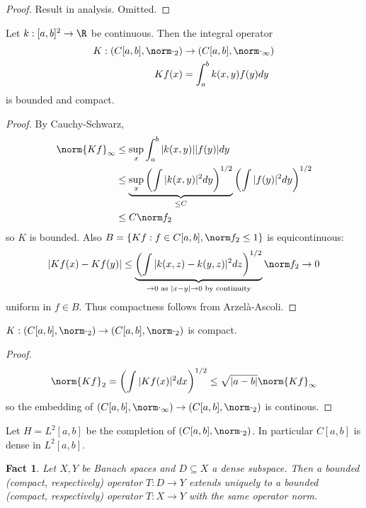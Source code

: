 \documentclass[a4paper]{article}
\newtheorem*{fact}{Fact}
\begin{document}
\begin{proof}
  Result in analysis. Omitted.
\end{proof}

\begin{lemma}
  Let \(k: [a, b]^2 \to \R\) be continuous. Then the integral operator
  \begin{align*}
    K: (C[a, b], \norm \cdot_2) &\to (C[a, b], \norm \cdot_\infty) \\
    Kf(x) &= \int_a^b k(x, y) f(y) dy
  \end{align*}
  is bounded and compact.
\end{lemma}

\begin{proof}
  By Cauchy-Schwarz,
  \begin{align*}
    \norm{Kf}_\infty
    &\leq \sup_x \int_a^b |k(x, y)| |f(y)| dy \\
    &\leq \underbrace{\sup_x \left(\int |k(x, y)|^2 dy \right)^{1/2}}_{\leq C} \left( \int |f(y)|^2 dy \right)^{1/2} \\
    &\leq C \norm f_2
  \end{align*}
  so \(K\) is bounded. Also \(B = \{Kf: f \in C[a, b], \norm f_2 \leq 1\}\) is equicontinuous:
  \begin{align*}
    |Kf(x) - Kf(y)|
    \leq \underbrace{\left(\int |k(x, z) - k(y, z)|^2 dz \right)^{1/2}}_{\to 0 \text{ as } |x - y| \to 0 \text{ by continuity}} \norm f_2
    \to 0
  \end{align*}
  uniform in \(f \in B\). Thus compactness follows from Arzelà-Ascoli.
\end{proof}

\begin{corollary}
  \(K: (C[a, b], \norm \cdot_2) \to (C[a, b], \norm \cdot_2)\) is compact.
\end{corollary}

\begin{proof}
  \[
    \norm{Kf}_2
    = \left(\int |Kf(x)|^2 dx \right)^{1/2}
    \leq \sqrt{|a - b|} \norm{Kf}_\infty
  \]
  so the embedding of \((C[a, b], \norm \cdot_\infty) \to (C[a, b], \norm \cdot_2)\) is continous. %
\end{proof}

Let \(H = L^2[a, b]\) be the completion of \((C[a, b], \norm \cdot_2)\). In particular \(C[a, b]\) is dense in \(L^2[a, b]\).

\begin{fact}
  Let \(X, Y\) be Banach spaces and \(D \subseteq X\) a dense subspace. Then a bounded (compact, respectively) operator \(T: D \to Y\) extends uniquely to a bounded (compact, respectively) operator \(T: X \to Y\) with the same operator norm.
\end{fact}
\end{document}
